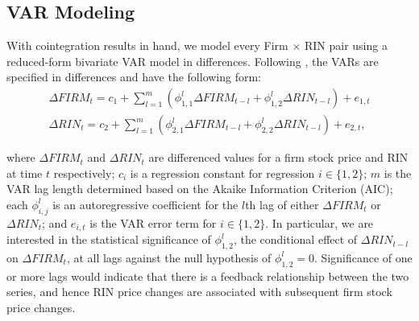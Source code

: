 \documentclass[11pt]{article}
\begin{document}
\subsection{VAR Modeling}

With cointegration results in hand, we model every Firm $\times$ RIN pair using a reduced-form bivariate VAR model in differences. Following \cite{Sims1980}, the VARs are specified in differences and have the following form:
\begin{equation}
\label{var}
\begin{split}
\Delta FIRM_t=c_1+\sum_{l=1}^m (\phi_{1,1}^l\Delta FIRM_{t-l}+\phi_{1,2}^l\Delta RIN_{t-l})+e_{1,t}
\\
\Delta RIN_t=c_2+\sum_{l=1}^m (\phi_{2,1}^l\Delta FIRM_{t-l}+\phi_{2,2}^l\Delta RIN_{t-l})+e_{2,t},
\end{split}
\end{equation}

\noindent where $\Delta FIRM_t$ and $\Delta RIN_t$ are differenced values for a firm stock price and RIN at time $t$ respectively; $c_i$ is a regression constant for regression $i\in\{1,2\}$; $m$ is the VAR lag length determined based on the Akaike Information Criterion (AIC); each $\phi_{i,j}^l$ is an autoregressive coefficient for the $l$th lag of either $\Delta FIRM_t$ or $\Delta RIN_t$; and $e_{i,t}$ is the VAR error term for $i\in\{1,2\}$. In particular, we are interested in the statistical significance of $\phi_{1,2}^l$, the conditional effect of $\Delta RIN_{t-l}$ on $\Delta FIRM_t$, at all lags against the null hypothesis of $\phi_{1,2}^l=0$. Significance of one or more lags would indicate that there is a feedback relationship between the two series, and hence RIN price changes are associated with subsequent firm stock price changes. 
\end{document}
